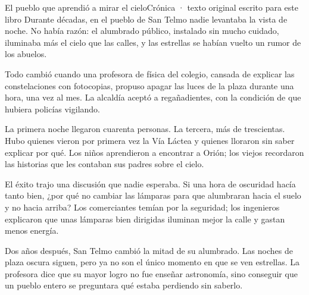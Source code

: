 \bitacora

\evaluacion
\begin{texto}{El pueblo que aprendió a mirar el cielo}{Crónica · texto original escrito para este libro}
\pa Durante décadas, en el pueblo de San Telmo nadie levantaba la vista de noche. No había razón: el alumbrado público,
instalado sin mucho cuidado, iluminaba más el cielo que las calles, y las estrellas se habían vuelto un rumor de los
abuelos.

\pa Todo cambió cuando una profesora de física del colegio, cansada de explicar las constelaciones con fotocopias, propuso
apagar las luces de la plaza durante una hora, una vez al mes. La alcaldía aceptó a regañadientes, con la condición de que
hubiera policías vigilando.

\pa La primera noche llegaron cuarenta personas. La tercera, más de trescientas. Hubo quienes vieron por primera vez la Vía
Láctea y quienes lloraron sin saber explicar por qué. Los niños aprendieron a encontrar a Orión; los viejos recordaron las
historias que les contaban sus padres sobre el cielo.

\pa El éxito trajo una discusión que nadie esperaba. Si una hora de oscuridad hacía tanto bien, ¿por qué no cambiar las
lámparas para que alumbraran hacia el suelo y no hacia arriba? Los comerciantes temían por la seguridad; los ingenieros
explicaron que unas lámparas bien dirigidas iluminan mejor la calle y gastan menos energía.

\pa Dos años después, San Telmo cambió la mitad de su alumbrado. Las noches de plaza oscura siguen, pero ya no son el único
momento en que se ven estrellas. La profesora dice que su mayor logro no fue enseñar astronomía, sino conseguir que un
pueblo entero se preguntara qué estaba perdiendo sin saberlo.
\end{texto}
